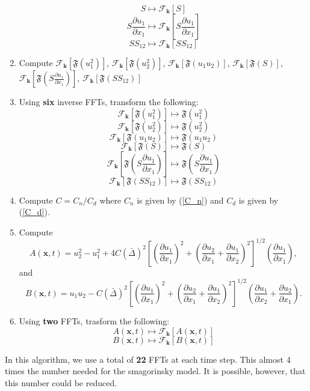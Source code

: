\documentclass[11pt,a4paper]{article}
\newcommand{\eq}[1]{(\ref{#1})}
\begin{document}
\begin{enumerate}
$$S\mapsto \mathcal{F}_{\boldsymbol{k}}\left[{S}\right]$$
$$S \frac{\partial u_1}{\partial x_1}\mapsto \mathcal{F}_{\boldsymbol{k}}\left[{S\frac{\partial u_1}{\partial x_1}}\right]$$
$$S S_{12}\mapsto \mathcal{F}_{\boldsymbol{k}}\left[{S S_{12}}\right]$$
\item Compute $\mathcal{F}_{\boldsymbol{k}}\left[{\mathfrak{F}\left(u_1^2\right)}\right]$, $\mathcal{F}_{\boldsymbol{k}}\left[{\mathfrak{F}\left(u_2^2\right)}\right]$, $\mathcal{F}_{\boldsymbol{k}}\left[{\mathfrak{F}\left(u_1u_2\right)}\right]$, $\mathcal{F}_{\boldsymbol{k}}\left[{\mathfrak{F}\left(S\right)}\right]$, $\mathcal{F}_{\boldsymbol{k}}\left[{\mathfrak{F}\left(S  \frac{\partial u_1}{\partial x_1}\right)}\right]$, $\mathcal{F}_{\boldsymbol{k}}\left[{\mathfrak{F}\left(S  S_{12}\right)}\right]$
\item Using \textbf{six} inverse FFTs, transform the following:
$$\mathcal{F}_{\boldsymbol{k}}\left[{\mathfrak{F}\left(u_1^2\right)}\right] \mapsto \mathfrak{F}\left(u_1^2\right)$$
$$\mathcal{F}_{\boldsymbol{k}}\left[{\mathfrak{F}\left(u_2^2\right)}\right] \mapsto \mathfrak{F}\left(u_2^2\right)$$
$$\mathcal{F}_{\boldsymbol{k}}\left[{\mathfrak{F}\left(u_1u_2\right)}\right] \mapsto \mathfrak{F}\left(u_1u_2\right)$$
$$\mathcal{F}_{\boldsymbol{k}}\left[{\mathfrak{F}\left(S\right)}\right] \mapsto \mathfrak{F}\left(S\right)$$
$$\mathcal{F}_{\boldsymbol{k}}\left[{\mathfrak{F}\left(S\frac{\partial u_1}{\partial x_1}\right)}\right] \mapsto \mathfrak{F}\left(S\frac{\partial u_1}{\partial x_1}\right)$$
$$\mathcal{F}_{\boldsymbol{k}}\left[{\mathfrak{F}\left(SS_{12}\right)}\right] \mapsto \mathfrak{F}\left(SS_{12}\right)$$
\item Compute $C = C_n/C_d$ where $C_n$ is given by \eq{C_n} and $C_d$ is given by \eq{C_d}.
\item Compute
$$A(\boldsymbol{x}, t) = u_2^2 - u_1^2 + 4C(\bar{\Delta})^2\left[\left( \frac{\partial {u}_1}{\partial x_1}\right)^2+\left( \frac{\partial {u}_2}{\partial x_1} + \frac{\partial {u}_1}{\partial x_2}\right)^2 \right]^{1/2}\left(\frac{\partial {u}_1}{\partial x_1}\right),$$
and 
$$B(\boldsymbol{x}, t) = u_1u_2 -C(\bar{\Delta})^2\left[\left( \frac{\partial {u}_1}{\partial x_1}\right)^2+\left( \frac{\partial {u}_2}{\partial x_1} + \frac{\partial {u}_1}{\partial x_2}\right)^2 \right]^{1/2}\left( \frac{\partial {u}_1}{\partial x_2} + \frac{\partial {u}_2}{\partial x_1}\right).$$
\item Using \textbf{two} FFTs, trasform the following:
$$A(\boldsymbol{x}, t) \mapsto \mathcal{F}_{\boldsymbol{k}}\left[A(\boldsymbol{x}, t) \right]$$
$$B(\boldsymbol{x}, t) \mapsto \mathcal{F}_{\boldsymbol{k}}\left[B(\boldsymbol{x}, t) \right]$$
\end{enumerate}

In this algorithm, we use a total of \textbf{22} FFTs at each time step. This almost 4 times the number needed for the smagorinsky model. It is possible, however, that this number could be reduced.

\clearpage

\end{document}
